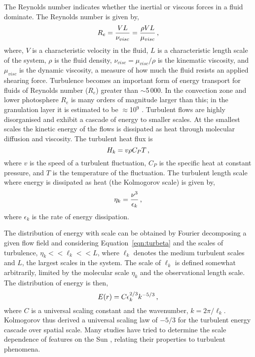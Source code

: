 The Reynolds number indicates whether the inertial or viscous forces in a fluid dominate. The Reynolds number is given by, 
\begin{equation}\label{eqn:magreynolds}
R_{e} = \frac{V L}{\nu_{visc}} = \frac{\rho V L}{\mu_{visc}} \mbox{\,,}
\end{equation}
where, $V$ is a characteristic velocity in the fluid, $L$ is a characteristic length scale of the system, $\rho$ is the fluid density, $\nu_{visc} = \mu_{visc}/\rho$ is the kinematic viscosity, and $\mu_{visc}$ is the dynamic viscosity, a measure of how much the fluid resists an applied shearing force. Turbulence becomes an important form of energy transport for fluids of Reynolds number ($R_{e}$) greater than $\sim$5\,000. In the convection zone and lower photosphere $R_{e}$ is many orders of magnitude larger than this; in the granulation layer it is estimated to be $\approx$10$^9$ \citep{Cox:1991}. Turbulent flows are highly disorganised and exhibit a cascade of energy to smaller scales. At the smallest scales the kinetic energy of the flows is dissipated as heat through molecular diffusion and viscosity. The turbulent heat flux is
\begin{equation}
H_{k} = v \rho C_{P} T \mbox{\,,}
\end{equation}
where $v$ is the speed of a turbulent fluctuation, $C_{P}$ is the specific heat at constant pressure, and $T$ is the temperature of the fluctuation. The turbulent length scale where energy is dissipated as heat (the Kolmogorov scale) is given by,
\begin{equation}\label{eqn:turbeta}
\eta_k = \frac{\nu^3}{\epsilon_k} \mbox{\,,}
\end{equation}
where $\epsilon_k$ is the rate of energy dissipation.

The distribution of energy with scale can be obtained by Fourier decomposing a given flow field and considering Equation~\ref{eqn:turbeta} and the scales of turbulence, $\eta_k << \ell_{k} << L$, where $\ell_{k}$ denotes the medium turbulent scales and $L$, the largest scales in the system. The scale of $\ell_{k}$ is defined somewhat arbitrarily, limited by the molecular scale $\eta_k$ and the observational length scale. The distribution of energy is then,
\begin{equation}
E(r) = C \epsilon_k^{2/3} k^{-5/3} \mbox{\,,}
\end{equation}
where $C$ is a universal scaling constant and the wavenumber, $k = 2\pi/\ell_{k}$. Kolmogorov thus derived a universal scaling law of $-5/3$ for the turbulent energy cascade over spatial scale. Many studies have tried to determine the scale dependence of features on the Sun \citep{Hewett:2008,parnell:2009}, relating their properties to turbulent phenomena.

